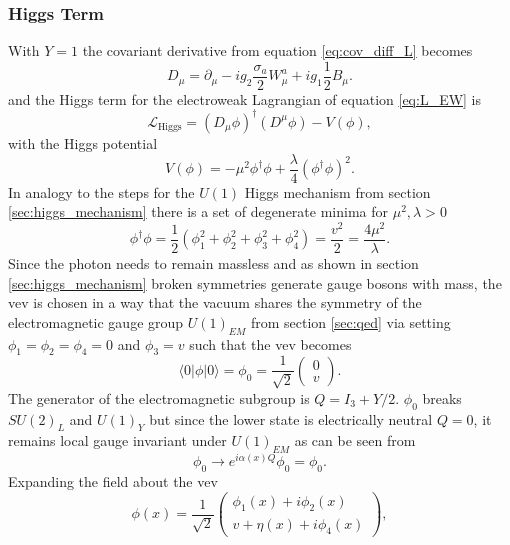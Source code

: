 \subsubsection*{Higgs Term}
With $Y=1$ the covariant derivative from equation \ref{eq:cov_diff_L} becomes
\begin{equation}
    D_\mu=\partial_\mu- i g_2\frac{{\sigma}_a}{2}W_\mu^a+ ig_1\frac{1}{2}B_\mu.
\end{equation}
and the Higgs term for the electroweak Lagrangian of equation \ref{eq:L_EW} is
\begin{equation}
    \mathcal{L}_\text{Higgs}= \left(D_\mu\phi\right)^\dagger (D^\mu\phi)-V(\phi),
    \label{eq:L_higgs}
\end{equation}
with the Higgs potential
\begin{equation}
    V(\phi) = -\mu^2\phi^\dagger\phi+\frac{\lambda}{4}\left(\phi^\dagger\phi\right)^2.
    \label{eq:Higgs_initial_potential}
\end{equation}
In analogy to the steps for the $U(1)$ Higgs mechanism from section \ref{sec:higgs_mechanism} there is a set of degenerate minima for $\mu^2,\lambda>0$
\begin{equation}
    \phi^\dagger\phi=\frac{1}{2}(\phi_1^2+\phi_2^2+\phi_3^2+\phi_4^2)=\frac{v^2}{2}=\frac{4\mu^2}{\lambda}.
    \label{eq:higgs_vev}
\end{equation}
Since the photon needs to remain massless and as shown in section \ref{sec:higgs_mechanism} broken symmetries generate gauge bosons with mass, the \ac{vev} is chosen in a way that the vacuum shares the symmetry of the electromagnetic gauge group $U(1)_{EM}$ from section \ref{sec:qed} via setting \mbox{$\phi_1=\phi_2=\phi_4=0$} and $\phi_3=v$ such that the \ac{vev} becomes
\begin{equation}
    \langle0\vert \phi \vert0\rangle=\phi_0=\frac{1}{\sqrt{2}}
    \begin{pmatrix}
        0 \\
        v
    \end{pmatrix}.
\end{equation}
The generator of the electromagnetic subgroup is $Q=I_3+Y/2$. $\phi_0$ breaks $SU(2)_L$ and $U(1)_Y$ but since the lower state is electrically neutral $Q=0$, it remains local gauge invariant under $U(1)_{EM}$ as can be seen from
\begin{equation}
    \phi_0 \rightarrow e^{i\alpha(x)Q}\phi_0=\phi_0.
\end{equation}
Expanding the field about the \ac{vev}
\begin{equation}
    \phi(x)=\frac{1}{\sqrt{2}}
    \begin{pmatrix}
        \phi_1 (x)+i \phi_2 (x) \\
        v+ \eta(x)+i \phi_4 (x)
    \end{pmatrix},
\end{equation}
